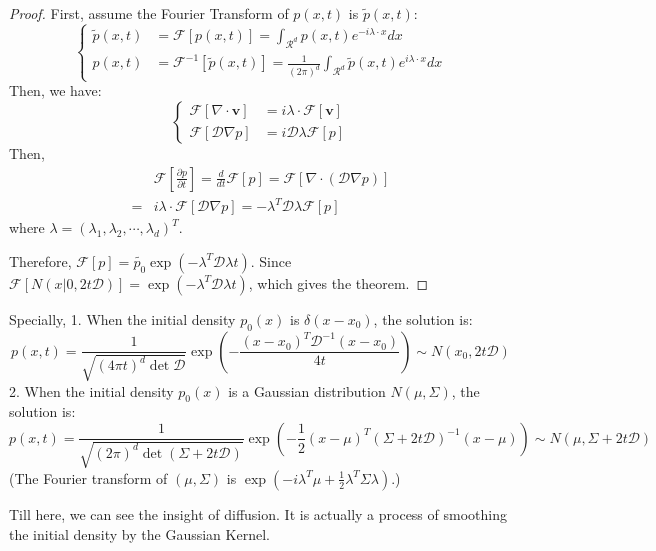\begin{proof}
    First, assume the Fourier Transform of $p(x, t)$ is $\tilde{p}(x, t)$:
    \begin{equation}\left\{
        \begin{aligned}
            \tilde{p}(x, t) &= \mathscr{F}\left[p(x, t)\right]=\int_{\mathcal{R}^d} p(x, t)e^{-i\lambda\cdot x}dx\\
            p(x, t) &= \mathscr{F}^{-1}\left[\tilde{p}(x, t)\right]=\frac{1}{(2\pi)^d}\int_{\mathcal{R}^d} \tilde{p}(x, t)e^{i\lambda\cdot x}dx
        \end{aligned}\right.
    \end{equation} 
    Then, we have:
    \begin{equation}\left\{
        \begin{aligned}
            \mathscr{F}\left[\nabla\cdot \mathbf{v}\right] &= i\lambda\cdot \mathscr{F}\left[\mathbf{v}\right]\\
            \mathscr{F}\left[\mathcal{D}\nabla p\right] &= i\mathcal{D}\lambda\mathscr{F}\left[p\right]
        \end{aligned}\right.
    \end{equation}
    Then, 
    \begin{equation}
        \begin{aligned}
            &\mathscr{F}\left[\frac{\partial p}{\partial t}\right] = \frac{d}{dt}\mathscr{F}\left[p\right] = \mathscr{F}\left[\nabla\cdot\left(\mathcal{D}\nabla p\right)\right] \\
            =& i\lambda\cdot \mathscr{F}\left[\mathcal{D}\nabla p\right]=-\lambda^T\mathcal{D}\lambda \mathscr{F}\left[p\right]
        \end{aligned}
    \end{equation}
    where $\lambda = \left(\lambda_1, \lambda_2, \cdots, \lambda_d\right)^T$. 

    Therefore, $\mathscr{F}\left[p\right] = \tilde{p_0}\exp\left(-\lambda^T\mathcal{D}\lambda t\right)$. 
    Since $\mathscr{F}\left[N(x|0, 2t\mathcal{D})\right]=\exp\left(-\lambda^T\mathcal{D}\lambda t\right)$, which gives the theorem.
\end{proof}

\begin{remark}
    Specially, 1. When the initial density $p_0(x)$ is $\delta(x - x_0)$, the solution is:
\begin{equation}
    p(x, t) = \frac{1}{\sqrt{(4\pi t)^d\det{\mathcal{D}}}}\exp\left(-\frac{(x-x_0)^T\mathcal{D}^{-1}(x-x_0)}{4t}\right)\sim N(x_0, 2t\mathcal{D})
\end{equation}
2. When the initial density $p_0(x)$ is a Gaussian distribution $N(\mu, \Sigma)$, the solution is:
\begin{equation}
    p(x, t) = \frac{1}{\sqrt{(2\pi)^d\det(\Sigma + 2t\mathcal{D})}}\exp\left(-\frac{1}{2}\left(x-\mu\right)^T\left(\Sigma + 2t\mathcal{D}\right)^{-1}\left(x-\mu\right)\right)\sim N(\mu, \Sigma + 2t\mathcal{D})
\end{equation}
(The Fourier transform of $\left(\mu, \Sigma \right)$ is $\exp \left(-i\lambda^T\mu + \frac{1}{2}\lambda^T\Sigma\lambda\right)$.)
\end{remark}

Till here, we can see the insight of diffusion. It is actually a process of smoothing the initial density by the Gaussian Kernel.
